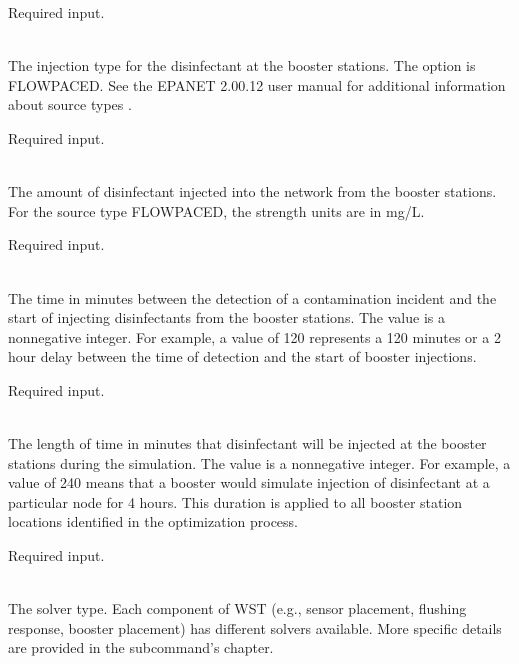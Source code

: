 \begin{description}[topsep=0pt,parsep=0.5em,itemsep=-0.4em]
\begin{description}[topsep=0pt,parsep=0.5em,itemsep=-0.4em]
                Required input.
    \item[{type}]\hfill
\\The injection type for the disinfectant at the booster stations. The option is FLOWPACED. 
                See the EPANET 2.00.12 user manual for additional information about source types \cite{EPANETusermanual}.
                
                Required input.
    \item[{strength}]\hfill
\\The amount of disinfectant injected into the network from the booster stations. 
                For the source type FLOWPACED, the strength units are in mg/L.
            
                Required input.
    \item[{response time}]\hfill
\\The time in minutes between the detection of a contamination incident and 
                the start of injecting disinfectants from the booster stations. The value 
                is a nonnegative integer. For example, a value of 120 represents 
                a 120 minutes or a 2 hour delay between the time of detection and 
                the start of booster injections.
                
                Required input.
    \item[{duration}]\hfill
\\The length of time in minutes that disinfectant will be injected at the booster 
                stations during the simulation.	The value is a nonnegative integer. For example, 
                a value of 240 means that a booster would simulate injection of disinfectant 
                at a particular node for 4 hours. This duration is applied to all booster 
                station locations identified in the optimization process.
                
                Required input.
  \end{description}
  \item[{solver}]\hfill
  \begin{description}[topsep=0pt,parsep=0.5em,itemsep=-0.4em]
    \item[{type}]\hfill
\\The solver type. Each component of WST
				(e.g., sensor placement, flushing response, booster 
				placement) has different 
				solvers available. More specific details are provided in 
				the subcommand's chapter.
                

\end{description}
\end{description}
